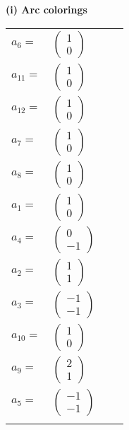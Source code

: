 \documentclass[1p]{elsarticle_modified}
\theoremstyle{definition}
\begin{document}
\flushleft \textbf{(i) Arc colorings}\\
\begin{tabular}{m{7pt} m{180pt} m{7pt} m{180pt} }
\flushright $a_{6}=$&$\begin{pmatrix}1\\0\end{pmatrix}$ \\
\flushright $a_{11}=$&$\begin{pmatrix}1\\0\end{pmatrix}$ \\
\flushright $a_{12}=$&$\begin{pmatrix}1\\0\end{pmatrix}$ \\
\flushright $a_{7}=$&$\begin{pmatrix}1\\0\end{pmatrix}$ \\
\flushright $a_{8}=$&$\begin{pmatrix}1\\0\end{pmatrix}$ \\
\flushright $a_{1}=$&$\begin{pmatrix}1\\0\end{pmatrix}$ \\
\flushright $a_{4}=$&$\begin{pmatrix}0\\-1\end{pmatrix}$ \\
\flushright $a_{2}=$&$\begin{pmatrix}1\\1\end{pmatrix}$ \\
\flushright $a_{3}=$&$\begin{pmatrix}-1\\-1\end{pmatrix}$ \\
\flushright $a_{10}=$&$\begin{pmatrix}1\\0\end{pmatrix}$ \\
\flushright $a_{9}=$&$\begin{pmatrix}2\\1\end{pmatrix}$ \\
\flushright $a_{5}=$&$\begin{pmatrix}-1\\-1\end{pmatrix}$\\&\end{tabular}
\end{document}
